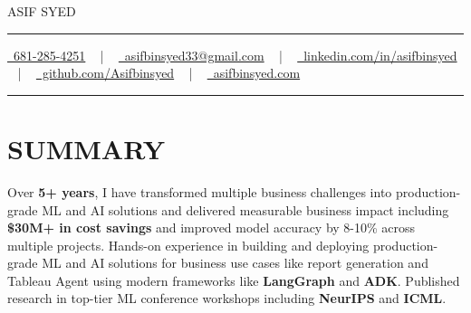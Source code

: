 \documentclass[letterpaper,10pt]{article}
\newcommand{\documentTitle}[2]{
  \begin{center}
    {\Huge\color{accentTitle} #1}
    \vspace{10pt}
    {\color{accentLine} \hrule}
    \vspace{2pt}
    \footnotesize{#2}
    \vspace{2pt}
    {\color{accentLine} \hrule}
  \end{center}
}
\newcommand{\tinysection}[1]{
  \phantomsection
  \addcontentsline{toc}{section}{#1}
  {\large{\bfseries\color{accentText}#1} {\color{accentLine} |}}
}
\begin{document}

\documentTitle{ASIF SYED}{
    \href{tel:6812854251}{
      \raisebox{-0.05\height} \faPhone\ 681-285-4251} ~ | ~
    \href{mailto:asifbinsyed33@gmail.com}{
      \raisebox{-0.15\height} \faEnvelope\ asifbinsyed33@gmail.com} ~ | ~
    \href{https://linkedin.com/in/asifbinsyed/}{
      \raisebox{-0.15\height} \faLinkedin\ linkedin.com/in/asifbinsyed} ~ | ~
    \href{https://github.com/Asifbinsyed}{
      \raisebox{-0.15\height} \faGithub\ github.com/Asifbinsyed} ~ | ~
\href{https://asifbinsyed.github.io}{
      \raisebox{-0.15\height} \faGlobe\ asifbinsyed.com}
  }

\section{SUMMARY} 
Over \textbf{5+ years}, I have transformed multiple business challenges into production-grade ML and AI solutions and delivered measurable business impact including \textbf{\$30M+ in cost savings} and improved model accuracy by 8-10\% across multiple projects. Hands-on experience in building and deploying production-grade ML and AI solutions for business use cases like report generation and Tableau Agent using modern frameworks like \textbf{LangGraph} and \textbf{ADK}. Published research in top-tier ML conference workshops including \textbf{NeurIPS} and \textbf{ICML}.

\end{document}
